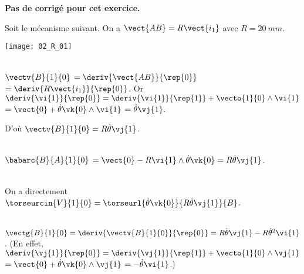 \normaltrue
\correctionfalse


\setcounter{numques}{0}


\ifcorrection
\else
\textbf{Pas de corrigé pour cet exercice.}
\fi

\ifprof
\else
Soit le mécanisme suivant. On a $\vect{AB}=R\vect{i_1}$ avec $R=\SI{20}{mm}$. 
\begin{center}
\texttt{[image: 02\_R\_01]}
\end{center}
\fi

\ifprof ~\\
$\vectv{B}{1}{0}$ $ = \deriv{\vect{AB}}{\rep{0}}$ $=\deriv{R\vect{i_1}}{\rep{0}}$.
Or $\deriv{\vi{1}}{\rep{0}} = \deriv{\vi{1}}{\rep{1}} + \vecto{1}{0}\wedge \vi{1} $ $=\vect{0}+\dot{\theta}\vk{0}\wedge \vi{1}$ $=\dot{\theta}\vj{1}$.

D'où $\vectv{B}{1}{0}=R\dot{\theta}\vj{1}$.
\else
\fi

\ifprof ~\\
$\babarc{B}{A}{1}{0}$ $=\vect{0}-R\vi{1}\wedge \dot{\theta}\vk{0} =R\dot{\theta}\vj{1} $.

\else
\fi

\ifprof ~\\
On a directement $\torseurcin{V}{1}{0} = \torseurl{\dot{\theta}\vk{0}}{R\dot{\theta}\vj{1}}{B}$.
\else
\fi

\ifprof ~\\
 $\vectg{B}{1}{0} = \deriv{\vectv{B}{1}{0}}{\rep{0}}=R\ddot{\theta}\vj{1}-R\dot{\theta}^2\vi{1}$.
(En effet,  $\deriv{\vj{1}}{\rep{0}} = \deriv{\vj{1}}{\rep{1}} + \vecto{1}{0}\wedge \vj{1} $ $=\vect{0}+\dot{\theta}\vk{0}\wedge \vj{1}$ $=-\dot{\theta}\vi{1}$.)
 
\else
\fi


